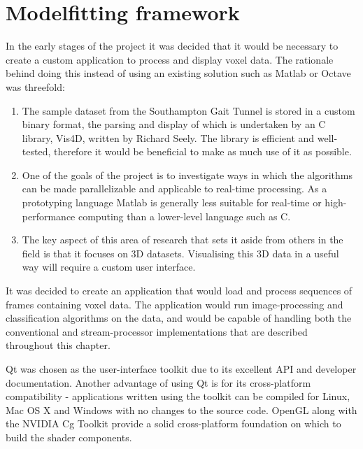 \section{Modelfitting framework}

In the early stages of the project it was decided that it would be necessary to create a custom application to process and display voxel data.
The rationale behind doing this instead of using an existing solution such as Matlab or Octave was threefold:

\begin{enumerate}
	\item The sample dataset from the Southampton Gait Tunnel is stored in a custom binary format, the parsing and display of which is
		undertaken by an C library, Vis4D, written by Richard Seely.
		The library is efficient and well-tested, therefore it would be beneficial to make as much use of it as possible.
	\item One of the goals of the project is to investigate ways in which the algorithms can be made parallelizable and applicable to real-time processing.
		As a prototyping language Matlab is generally less suitable for real-time or high-performance computing than a lower-level language such as C.
	\item The key aspect of this area of research that sets it aside from others in the field is that it focuses on 3D datasets.
		Visualising this 3D data in a useful way will require a custom user interface.
\end{enumerate}

It was decided to create an application that would load and process sequences of frames containing voxel data.
The application would run image-processing and classification algorithms on the data, and would be capable of handling both
the conventional and stream-processor implementations that are described throughout this chapter.


Qt \cite{Qt} was chosen as the user-interface toolkit due to its excellent API and developer documentation.
Another advantage of using Qt is for its cross-platform compatibility - applications written using the toolkit can be compiled
for Linux, Mac OS X and Windows with no changes to the source code.
OpenGL along with the NVIDIA Cg Toolkit \cite{CgToolkit} provide a solid cross-platform foundation on which to build the shader components.

